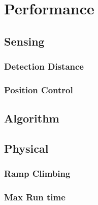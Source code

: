 \section{Performance}

\subsection{Sensing}

\subsubsection{Detection Distance}

\subsubsection{Position Control}

\subsection{Algorithm}



\subsection{Physical}



\subsubsection{Ramp Climbing}



\subsubsection{Max Run time}

